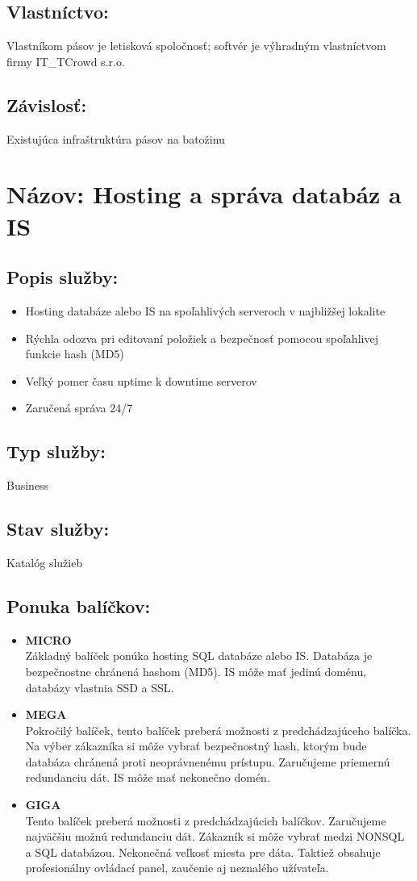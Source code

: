 \documentclass[a4paper, 11pt]{article}
\begin{document}
\subsection*{Vlastníctvo:}
Vlastníkom pásov je letisková spoločnosť; softvér je výhradným vlastníctvom firmy IT\_TCrowd s.r.o.
\subsection*{Závislosť:}
Existujúca infraštruktúra pásov na batožinu

\section*{Názov: Hosting a správa databáz a IS}
\subsection*{Popis služby:}
\begin{itemize}
\item Hosting databáze alebo IS na spoľahlivých serveroch v najbližšej lokalite
\item Rýchla odozva pri editovaní položiek a bezpečnosť pomocou spoľahlivej funkcie hash (MD5)
\item Veľký pomer času uptime k downtime serverov
\item Zaručená správa 24/7
\end{itemize}
\subsection*{Typ služby:}
Business
\subsection*{Stav služby:}
Katalóg služieb
\subsection*{Ponuka balíčkov:}
\begin{itemize}
\item \textbf{MICRO}\\
Základný balíček ponúka hosting SQL databáze alebo IS. Databáza je bezpečnostne chránená hashom (MD5). IS môže mať jedinú doménu, databázy vlastnia SSD a SSL.
\item \textbf{MEGA}\\
Pokročilý balíček, tento balíček preberá možnosti z predchádzajúceho balíčka. Na výber zákazníka si môže vybrať bezpečnostný hash, ktorým bude databáza chránená proti neoprávnenému prístupu. Zaručujeme priemernú redundanciu dát. IS môže mať nekonečno domén.
\item \textbf{GIGA}\\
Tento balíček preberá možnosti z predchádzajúcich balíčkov. Zaručujeme najväčšiu možnú redundanciu dát. Zákazník si môže vybrať medzi NONSQL a SQL databázou. Nekonečná veľkosť miesta pre dáta. Taktiež obsahuje profesionálny ovládací panel, zaučenie aj neznalého užívateľa.
\end{itemize}
\end{document}
